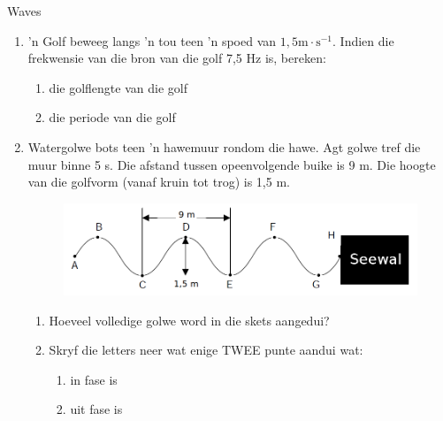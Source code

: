     \begin{eocexercises}{Waves}
            \nopagebreak
\label{m38806*id324367}\begin{enumerate}[noitemsep, label=\textbf{\arabic*}. ] 
\label{m38806*uid128}\item  'n Golf beweeg langs 'n tou teen 'n spoed van $1,5\text{m}\ensuremath{\cdot}\text{s}{}^{-1}$. Indien die frekwensie van die bron van die golf 7,5 Hz is, bereken:
\label{m38806*id324525}\begin{enumerate}[noitemsep, label=\textbf{\alph*}. ] 
            \label{m38806*uid129}\item die golflengte van die golf
\label{m38806*uid130}\item die periode van die golf
\end{enumerate}
                \item Watergolwe bots teen 'n  hawemuur rondom die hawe. Agt golwe tref die muur
           binne 5 s. Die afstand tussen opeenvolgende buike is 9 m. Die hoogte van
          die golfvorm (vanaf kruin tot trog) is 1,5 m.
    \setcounter{subfigure}{0}
	\begin{figure}[H] %
    \begin{center}
    \label{m38806*id634524!!!underscore!!!media}\label{m38806*id634524!!!underscore!!!printimage}\includegraphics[width=0.8\columnwidth]{col11305.imgs/m38806_seawall.png} %
      \vspace{2pt}
    \vspace{.1in}
    \end{center}
 \end{figure}       
\label{m38806*uid081231}\begin{enumerate}[noitemsep, label=\textbf{\alph*}. ] 
            \item Hoeveel volledige golwe word in die skets aangedui?
\item Skryf die letters neer wat enige TWEE punte aandui wat:
\label{m38806*uid0821323}\begin{enumerate}[noitemsep, label=\textbf{\roman*}. ] 
            \item in fase is
\item uit fase is

\end{enumerate}
\end{enumerate}
\end{enumerate}
\end{eocexercises}
